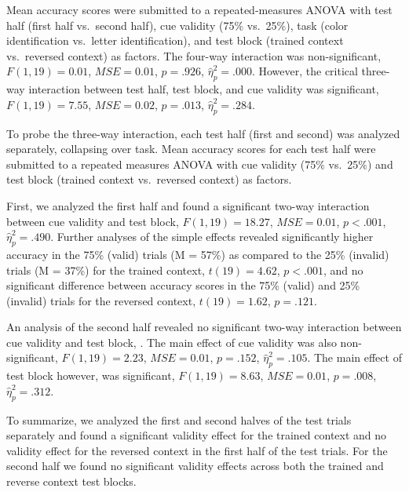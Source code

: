\documentclass[]{DissertateCUNY}
\begin{document}
Mean accuracy scores were submitted to a repeated-measures ANOVA with
test half (first half vs.~second half), cue validity (75\% vs.~25\%),
task (color identification vs.~letter identification), and test block
(trained context vs.~reversed context) as factors. The four-way
interaction was non-significant, \(F(1, 19) = 0.01\),
\(\mathit{MSE} = 0.01\), \(p = .926\), \(\hat{\eta}^2_p = .000\).
However, the critical three-way interaction between test half, test
block, and cue validity was significant, \(F(1, 19) = 7.55\),
\(\mathit{MSE} = 0.02\), \(p = .013\), \(\hat{\eta}^2_p = .284\).

To probe the three-way interaction, each test half (first and second)
was analyzed separately, collapsing over task. Mean accuracy scores for
each test half were submitted to a repeated measures ANOVA with cue
validity (75\% vs.~25\%) and test block (trained context vs.~reversed
context) as factors.

First, we analyzed the first half and found a significant two-way
interaction between cue validity and test block, \(F(1, 19) = 18.27\),
\(\mathit{MSE} = 0.01\), \(p < .001\), \(\hat{\eta}^2_p = .490\).
Further analyses of the simple effects revealed significantly higher
accuracy in the 75\% (valid) trials (M = 57\%) as compared to the 25\%
(invalid) trials (M = 37\%) for the trained context, \(t(19) = 4.62\),
\(p < .001\), and no significant difference between accuracy scores in
the 75\% (valid) and 25\% (invalid) trials for the reversed context,
\(t(19) = 1.62\), \(p = .121\).

An analysis of the second half revealed no significant two-way
interaction between cue validity and test block, . The main effect of
cue validity was also non-significant, \(F(1, 19) = 2.23\),
\(\mathit{MSE} = 0.01\), \(p = .152\), \(\hat{\eta}^2_p = .105\). The
main effect of test block however, was significant, \(F(1, 19) = 8.63\),
\(\mathit{MSE} = 0.01\), \(p = .008\), \(\hat{\eta}^2_p = .312\).

To summarize, we analyzed the first and second halves of the test trials
separately and found a significant validity effect for the trained
context and no validity effect for the reversed context in the first
half of the test trials. For the second half we found no significant
validity effects across both the trained and reverse context test
blocks.
\end{document}
